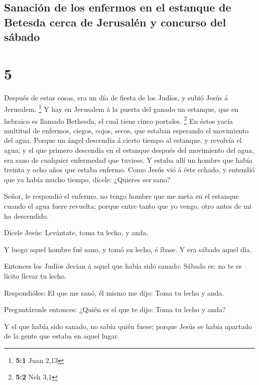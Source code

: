\hypertarget{sanaciuxf3n-de-los-enfermos-en-el-estanque-de-betesda-cerca-de-jerusaluxe9n-y-concurso-del-suxe1bado}{%
\subsection{Sanación de los enfermos en el estanque de Betesda cerca de
Jerusalén y concurso del
sábado}\label{sanaciuxf3n-de-los-enfermos-en-el-estanque-de-betesda-cerca-de-jerusaluxe9n-y-concurso-del-suxe1bado}}

\hypertarget{section-4}{%
\section{5}\label{section-4}}

 Después de estas cosas, era un día de fiesta de los
Judíos, y subió Jesús á Jerusalem. \footnote{\textbf{5:1} Juan 2,13}
 Y hay en Jerusalem á la puerta del ganado un estanque,
que en hebraico es llamado Bethesda, el cual tiene cinco portales.
\footnote{\textbf{5:2} Neh 3,1}  En éstos yacía multitud
de enfermos, ciegos, cojos, secos, que estaban esperando el movimiento
del agua.  Porque un ángel descendía á cierto tiempo al
estanque, y revolvía el agua; y el que primero descendía en el estanque
después del movimiento del agua, era sano de cualquier enfermedad que
tuviese.  Y estaba allí un hombre que había treinta y ocho
años que estaba enfermo.  Como Jesús vió á éste echado, y
entendió que ya había mucho tiempo, dícele: ¿Quieres ser sano?

 Señor, le respondió el enfermo, no tengo hombre que me
meta en el estanque cuando el agua fuere revuelta; porque entre tanto
que yo vengo, otro antes de mí ha descendido.

 Dícele Jesús: Levántate, toma tu lecho, y anda.

 Y luego aquel hombre fué sano, y tomó su lecho, é íbase.
Y era sábado aquel día.

 Entonces los Judíos decían á aquel que había sido
sanado: Sábado es: no te es lícito llevar tu lecho.

 Respondióles: El que me sanó, él mismo me dijo: Toma tu
lecho y anda.

 Preguntáronle entonces: ¿Quién es el que te dijo: Toma
tu lecho y anda?

 Y el que había sido sanado, no sabía quién fuese; porque
Jesús se había apartado de la gente que estaba en aquel lugar.

